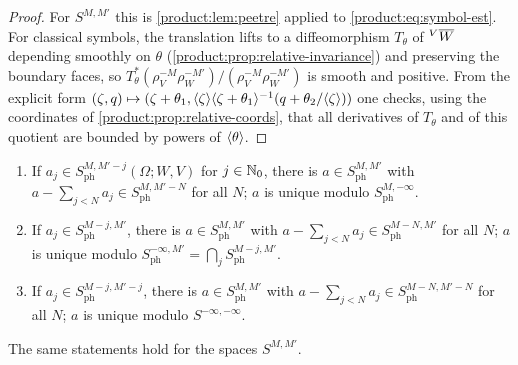 \begin{proof}
For $S^{M,M'}$ this is \cref{product:lem:peetre} applied to
\eqref{product:eq:symbol-est}. For classical symbols, the translation lifts to a
diffeomorphism $T_\theta$ of ${}^{V}\overline{W}$ depending smoothly on $\theta$
(\cref{product:prop:relative-invariance}) and preserving the boundary faces, so
$T_\theta^*(\rho_V^{-M}\rho_W^{-M'})/(\rho_V^{-M}\rho_W^{-M'})$ is smooth and
positive. From the explicit form $(\zeta,q)\mapsto(\zeta+\theta_1,
\langle \zeta\rangle\langle \zeta+\theta_1\rangle^{-1}(q+\theta_2/\langle \zeta\rangle))$ one checks, using the
coordinates of \cref{product:prop:relative-coords}, that all derivatives of
$T_\theta$ and of this quotient are bounded by powers of $\langle \theta\rangle$.
\end{proof}

\begin{proposition}\label{product:prop:asymptotic}
\begin{enumerate}[label=\textup{(\roman*)}]
\item If $a_j\in S^{M,M'-j}_{\mathrm{ph}}(\Omega;W,V)$ for $j\in\mathbb{N}_0$, there is
$a\in S^{M,M'}_{\mathrm{ph}}$ with $a-\sum_{j<N}a_j\in S^{M,M'-N}_{\mathrm{ph}}$ for
all $N$; $a$ is unique modulo $S^{M,-\infty}_{\mathrm{ph}}$.
\item If $a_j\in S^{M-j,M'}_{\mathrm{ph}}$, there is $a\in S^{M,M'}_{\mathrm{ph}}$ with
$a-\sum_{j<N}a_j\in S^{M-N,M'}_{\mathrm{ph}}$ for all $N$; $a$ is unique modulo
$S^{-\infty,M'}_{\mathrm{ph}}=\bigcap_jS^{M-j,M'}_{\mathrm{ph}}$.
\item If $a_j\in S^{M-j,M'-j}_{\mathrm{ph}}$, there is $a\in S^{M,M'}_{\mathrm{ph}}$
with $a-\sum_{j<N}a_j\in S^{M-N,M'-N}_{\mathrm{ph}}$ for all $N$; $a$ is unique
modulo $S^{-\infty,-\infty}$.
\end{enumerate}
The same statements hold for the spaces $S^{M,M'}$.
\end{proposition}

